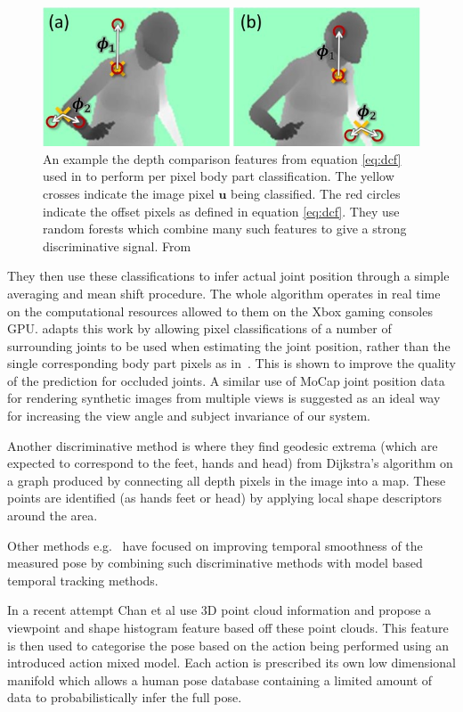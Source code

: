\documentclass[11pt]{article} %
\begin{document}
\begin{figure}
\centering
\includegraphics*[width=0.6\linewidth,clip]{kinectFeature}
\caption{An example the depth comparison features from equation \ref{eq:dcf} used in \cite{Shotton2011} to perform per pixel body part classification. The yellow crosses indicate the image pixel $\boldsymbol{u}$ being classified. The red circles indicate the offset pixels as defined in equation \ref{eq:dcf}. They use random forests which combine many such features to give a strong discriminative signal. From~\cite{Shotton2011} \label{fig:dcf}  } 
\end{figure}

They then use these classifications to infer actual joint position through a simple averaging and mean shift procedure. The whole algorithm operates in real time on the computational resources allowed to them on the Xbox gaming consoles GPU. \cite{Shotton2013a} adapts this work by allowing pixel classifications of a number of surrounding joints to be used when estimating the joint position, rather than the single corresponding body part pixels as in~\cite{Shotton2011}. This is shown to improve the quality of the prediction for occluded joints. A similar use of MoCap joint position data for rendering synthetic images from multiple views is suggested as an ideal way for increasing the view angle and subject invariance of our system.

Another discriminative method is \cite{Plagemann2010} where they find geodesic extrema (which are expected to correspond to the feet, hands and head) from Dijkstra’s algorithm on a graph produced by connecting all depth pixels in the image into a map. These points are identified (as hands feet or head) by applying local shape descriptors around the area. 

Other methods e.g.~\cite{Ye2011,Wei2011,Baak2011,Zhu2008} have focused on improving temporal smoothness of the measured pose by combining such discriminative methods with model based temporal tracking methods. 

In a recent attempt Chan et al \cite{Chan2014} use 3D point cloud information and propose a viewpoint and shape histogram feature based off these point clouds. This feature is then used to categorise the pose based on the action being performed using an introduced action mixed model. Each action is prescribed its own low dimensional manifold which allows a human pose database containing a limited amount of data to probabilistically infer the full pose.
\end{document}
